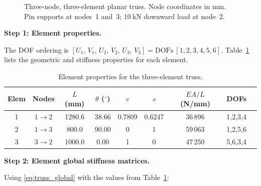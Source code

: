 \begin{example}
\begin{figure}[htbp]
\caption{Three-node, three-element planar truss. Node coordinates in mm.
Pin supports at nodes~1 and~3; $10\ \text{kN}$ downward load at node~2.}
\label{fig:truss_example}
\end{figure}

\medskip
\noindent\textbf{Step 1: Element properties.}

The DOF ordering is
$[U_1,\,V_1,\,U_2,\,V_2,\,U_3,\,V_3] = \text{DOFs}\ [1,2,3,4,5,6]$.
Table~\ref{tab:truss_elements} lists the geometric and stiffness properties
for each element.

\begin{table}[htbp]
\centering
\small
\caption{Element properties for the three-element truss.}
\label{tab:truss_elements}
\begin{tabular}{@{}ccccccccc@{}}
\toprule
Elem & Nodes & $L$ (mm) & $\theta$ ($^\circ$) & $c$ & $s$ &
$EA/L$ (N/mm) & DOFs \\
\midrule
1 & $1\to2$ & 1280.6 & 38.66 & 0.7809 & 0.6247 & 36\,896 & 1,2,3,4 \\
2 & $1\to3$ &  800.0 & 90.00 & 0      & 1      & 59\,063 & 1,2,5,6 \\
3 & $3\to2$ & 1000.0 &  0.00 & 1      & 0      & 47\,250 & 5,6,3,4 \\
\bottomrule
\end{tabular}
\end{table}

\medskip
\noindent\textbf{Step 2: Element global stiffness matrices.}

Using \cref{eq:truss_global} with the values from Table~\ref{tab:truss_elements}:


\end{example}
